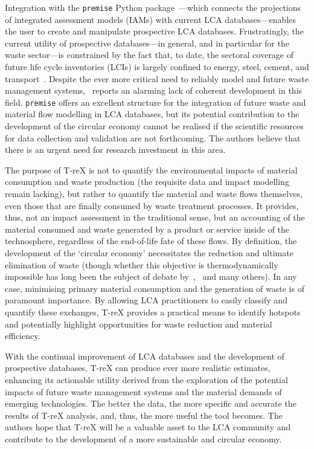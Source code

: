 \documentclass[a4paper,fleqn]{cas-dc}
\begin{document}
Integration with the \texttt{premise} Python
package~\citep{sacchi2022premise}---which connects the projections of
integrated assessment models (IAMs) with current LCA databases---enables the
user to create and manipulate prospective LCA databases. Frustratingly, the
current utility of prospective databases---in general, and in particular for
the waste sector---is constrained by the fact that, to date, the sectoral
coverage of future life cycle inventories (LCIs) is largely confined to energy,
steel, cement, and transport~\citep{sacchi2023premisedocs}. Despite the ever
more critical need to reliably model and future waste management
systems,~\cite{bisinella2024wastelca} reports an alarming lack of coherent
development in this field. \texttt{premise} offers an excellent structure for
the integration of future waste and material flow modelling in LCA databases,
but its potential contribution to the development of the circular economy
cannot be realised if the scientific resources for data collection and
validation are not forthcoming. The authors believe that there is an urgent
need for research investment in this area.


The purpose of T-reX is not to quantify the environmental impacts of material
consumption and waste production (the requisite data and impact modelling
remain lacking), but rather to quantify the material and waste flows
themselves, even those that are finally consumed by waste treatment processes.
It provides, thus, not an impact assessment in the traditional sense, but an
accounting of the material consumed and waste generated by a product or service
inside of the technosphere, regardless of the end-of-life fate of these flows.
By definition, the development of the `circular economy' necessitates the
reduction and ultimate elimination of waste (though whether this objective is
thermodynamically impossible has long been the subject of debate
by~\cite{ayres1998recycling},~\cite{reuter2012recyclinglimits} and many
others). In any case, minimising primary material consumption and the
generation of waste is of paramount importance. By allowing LCA practitioners
to easily classify and quantify these exchanges, T-reX provides a practical
means to identify hotspots and potentially highlight opportunities for waste
reduction and material efficiency.


With the continual improvement of LCA databases and the development of
prospective databases, T-reX can produce ever more realistic estimates,
enhancing its actionable utility derived from the exploration of the potential
impacts of future waste management systems and the material demands of emerging
technologies. The better the data, the more specific and accurate the results
of T-reX analysis, and, thus, the more useful the tool becomes. The authors
hope that T-reX will be a valuable asset to the LCA community and contribute to
the development of a more sustainable and circular economy.
\end{document}
